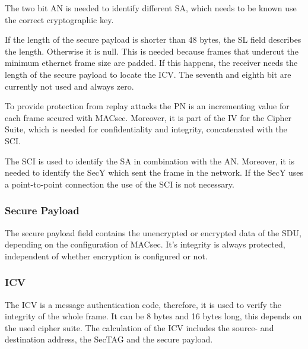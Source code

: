 The two bit \gls{AN} is needed to identify different \gls{SA}, which needs to be known use the correct cryptographic key.

If the length of the secure payload is shorter than 48 bytes, the \gls{SL} field describes the length.
Otherwise it is null.
This is needed because frames that undercut the minimum ethernet frame size are padded.
If this happens, the receiver needs the length of the secure payload to locate the \gls{ICV}.
The seventh and eighth bit are currently not used and always zero.

To provide protection from replay attacks the \gls{PN} is an incrementing value for each frame secured with \gls{MACsec}.
Moreover, it is part of the \gls{IV} for the Cipher Suite, which is needed for confidentiality and integrity, concatenated with the \gls{SCI}. %

The \gls{SCI} is used to identify the \gls{SA} in combination with the \gls{AN}.
Moreover, it is needed to identify the \gls{SecY} which sent the frame in the network.
If the \gls{SecY} uses a point-to-point connection the use of the \gls{SCI} is not necessary.

\subsubsection{Secure Payload}
The secure payload field contains the unencrypted or encrypted data of the \gls{SDU}, depending on the configuration of \gls{MACsec}.
It's integrity is always protected, independent of whether encryption is configured or not.

\subsubsection{\acrlong{ICV}}
The \gls{ICV} is a message authentication code, therefore, it is used to verify the integrity of the whole frame.
It can be 8 bytes and 16 bytes long, this depends on the used cipher suite.
The calculation of the \gls{ICV} includes the source- and destination address, the \gls{SecTAG} and the secure payload.
